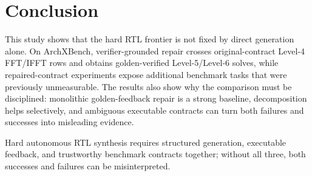 \documentclass[sigconf,anonymous]{acmart}
\newcommand{\arch}{ArchXBench\xspace}
\begin{document}
\section{Conclusion}

This study shows that the hard RTL frontier is not fixed by direct generation alone.
On \arch, verifier-grounded repair crosses original-contract Level-4 FFT/IFFT rows and obtains golden-verified Level-5/Level-6 solves, while repaired-contract experiments expose additional benchmark tasks that were previously unmeasurable.
The results also show why the comparison must be disciplined: monolithic golden-feedback repair is a strong baseline, decomposition helps selectively, and ambiguous executable contracts can turn both failures and successes into misleading evidence.

Hard autonomous RTL synthesis requires structured generation, executable feedback, and trustworthy benchmark contracts together; without all three, both successes and failures can be misinterpreted.



\end{document}
